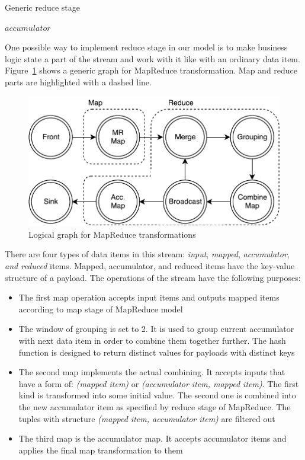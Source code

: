 \begin{algorithm}
\caption{Generic reduce stage}
\label{reduce}
\begin{algorithmic}
    \State $accumulator$ 
      \State {}
    \EndFor
    \State \Return {}
  \EndFunction
\end{algorithmic}
\end{algorithm}

One possible way to implement reduce stage in our model is to make business logic state a part of the stream and work with it like with an ordinary data item. Figure~\ref{mapreduce-graph-figure} shows a generic graph for MapReduce transformation. Map and reduce parts are highlighted with a dashed line.

\begin{figure}[htb]
  \centering
  \includegraphics[scale=0.5]{pics/mapreduce}
  \caption{Logical graph for MapReduce transformations}
  \label {mapreduce-graph-figure}
\end{figure}

There are four types of data items in this stream: {\it input}, {\it mapped}, {\it accumulator}, {\it and reduced} items. Mapped, accumulator, and reduced items have the key-value structure of a payload. The operations of the stream have the following purposes:

\begin{itemize}
  \item The first map operation accepts input items and outputs mapped items according to map stage of MapReduce model
  \item The window of grouping is set to 2. It is used to group current accumulator with next data item in order to combine them together further. The hash function is designed to return distinct values for payloads with distinct keys
  \item The second map implements the actual combining. It accepts inputs that have a form of: \textit{(mapped item)} or \textit{(accumulator item, mapped item)}. The first kind is transformed into some initial value. The second one is combined into the new accumulator item as specified by reduce stage of MapReduce. The tuples with structure \textit{(mapped item, accumulator item)} are filtered out
  \item The third map is the accumulator map. It accepts accumulator items and applies the final map transformation to them
\end{itemize}

